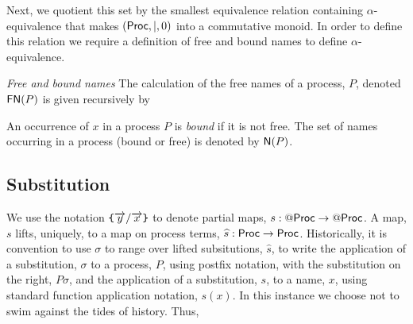 Next, we quotient this set by the smallest equivalence
relation containing $\alpha$-equivalence that makes $(\mathsf{Proc}, |, 0)$
into a commutative monoid. In order to define this relation we require
a definition of free and bound names to define $\alpha$-equivalence.

\begin{definition}
  \emph{Free and bound names} The calculation of the free names of a
  process, $P$, denoted $\mathsf{FN}(P)$ is given recursively by
  
  
  An occurrence of $x$ in a process $P$ is \textit{bound} if it is not
  free. The set of names occurring in a process (bound or free) is
  denoted by $\mathsf{N}(P)$.
\end{definition}

\subsection{Substitution}

We use the notation $\texttt{\{}\overrightarrow{y} / \overrightarrow{x} \texttt{\}}$ to denote
partial maps, $s : \mathsf{@} \mathsf{Proc} \rightarrow \mathsf{@} \mathsf{Proc}$. A map, $s$ lifts,
uniquely, to a map on process terms, $\widehat{s} : \mathsf{Proc} \rightarrow
\mathsf{Proc}$. Historically, it is convention to use $\sigma$ to range over
lifted subsitutions, $\widehat{s}$, to write the application of a
substitution, $\sigma$ to a process, $P$, using postfix notation, with
the substitution on the right, $P\sigma$, and the application of a
substitution, $s$, to a name, $x$, using standard function application
notation, $s(x)$. In this instance we choose not to swim against the
tides of history. Thus,

